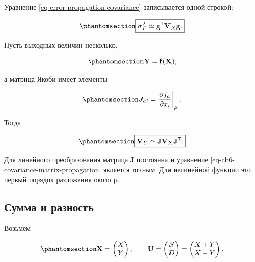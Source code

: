 \documentclass[
  russian,
  11pt,
  a4paper,
  open=any]{scrbook}
\begin{document}
Уравнение \ref{eq-error-propagation-covariance} записывается одной
строкой:

\begin{equation}\protect\phantomsection\label{eq-ch6-gradient-covariance-form}{
\boxed{
\sigma_F^2\simeq
\mathbf g^{\mathsf T}\mathbf V_X\mathbf g.
}
}\end{equation}

Пусть выходных величин несколько,

\begin{equation}\protect\phantomsection\label{eq-ch6-vector-transformation}{
\mathbf Y=\mathbf f(\mathbf X),
}\end{equation}

а матрица Якоби имеет элементы

\begin{equation}\protect\phantomsection\label{eq-ch6-jacobian-definition}{
J_{ai}=
\left.
\frac{\partial f_a}{\partial x_i}
\right|_{\boldsymbol\mu}.
}\end{equation}

Тогда

\begin{equation}\protect\phantomsection\label{eq-ch6-covariance-matrix-propagation}{
\boxed{
\mathbf V_Y
\simeq
\mathbf J\mathbf V_X\mathbf J^{\mathsf T}.
}
}\end{equation}

Для линейного преобразования матрица \(\mathbf J\) постоянна и уравнение
\ref{eq-ch6-covariance-matrix-propagation} является точным. Для
нелинейной функции это первый порядок разложения около
\(\boldsymbol\mu\).

\subsection{Сумма и
разность}\label{ux441ux443ux43cux43cux430-ux438-ux440ux430ux437ux43dux43eux441ux442ux44c}

Возьмём

\begin{equation}\protect\phantomsection\label{eq-ch6-sum-difference-vector-transformation}{
\mathbf X=
\begin{pmatrix}X\\Y\end{pmatrix},
\qquad
\mathbf U=
\begin{pmatrix}S\\D\end{pmatrix}
=
\begin{pmatrix}X+Y\\X-Y\end{pmatrix}.
}\end{equation}
\end{document}
